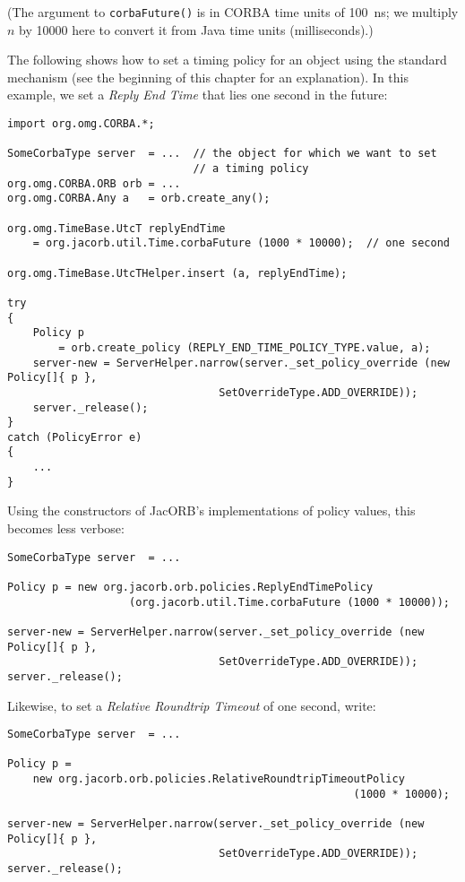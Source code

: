 (The argument to {\tt corbaFuture()} is in CORBA time units of
100~ns; we multiply $n$ by 10000 here to convert it from Java time
units (milliseconds).)

The following shows how to set a timing policy for an object using the
standard mechanism (see the beginning of this chapter for an
explanation).  In this example, we set a \emph{Reply End Time} that
lies one second in the future:

\begin{verbatim}
import org.omg.CORBA.*;

SomeCorbaType server  = ...  // the object for which we want to set
                             // a timing policy
org.omg.CORBA.ORB orb = ...
org.omg.CORBA.Any a   = orb.create_any();

org.omg.TimeBase.UtcT replyEndTime
    = org.jacorb.util.Time.corbaFuture (1000 * 10000);  // one second

org.omg.TimeBase.UtcTHelper.insert (a, replyEndTime);

try
{
    Policy p
        = orb.create_policy (REPLY_END_TIME_POLICY_TYPE.value, a);
    server-new = ServerHelper.narrow(server._set_policy_override (new Policy[]{ p },
                                 SetOverrideType.ADD_OVERRIDE));
    server._release();
}
catch (PolicyError e)
{
    ...
}
\end{verbatim}

\clearpage{}

Using the constructors of JacORB's implementations of policy values,
this becomes less verbose:

\begin{verbatim}
SomeCorbaType server  = ...

Policy p = new org.jacorb.orb.policies.ReplyEndTimePolicy
                   (org.jacorb.util.Time.corbaFuture (1000 * 10000));

server-new = ServerHelper.narrow(server._set_policy_override (new Policy[]{ p },
                                 SetOverrideType.ADD_OVERRIDE));
server._release();
\end{verbatim}

Likewise, to set a \emph{Relative Roundtrip Timeout} of one second,
write:

\begin{verbatim}
SomeCorbaType server  = ...

Policy p =
    new org.jacorb.orb.policies.RelativeRoundtripTimeoutPolicy
                                                      (1000 * 10000);

server-new = ServerHelper.narrow(server._set_policy_override (new Policy[]{ p },
                                 SetOverrideType.ADD_OVERRIDE));
server._release();
\end{verbatim}

